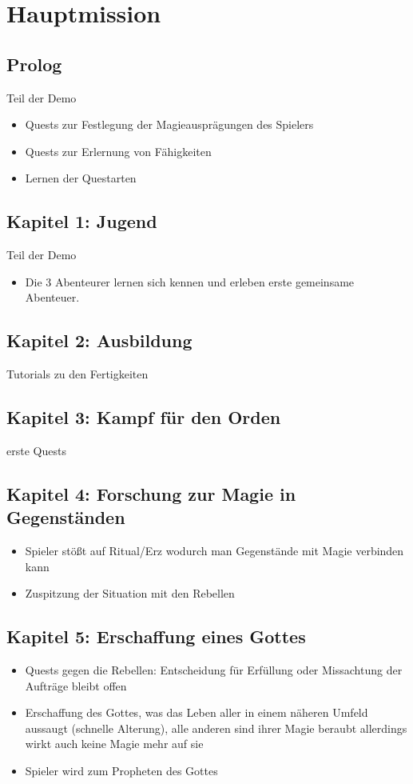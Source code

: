 \chapter{Hauptmission}
\section{Prolog}
Teil der Demo
\begin{itemize}
	\item Quests zur Festlegung der Magieausprägungen des Spielers
	\item Quests zur Erlernung von Fähigkeiten
	\item Lernen der Questarten
\end{itemize}
\section{Kapitel 1: Jugend}
Teil der Demo
\begin{itemize}
	\item Die 3 Abenteurer lernen sich kennen und erleben erste gemeinsame Abenteuer.
\end{itemize}
\section{Kapitel 2: Ausbildung}
Tutorials zu den Fertigkeiten
\section{Kapitel 3: Kampf für den Orden}
erste Quests
\section{Kapitel 4: Forschung zur Magie in Gegenständen}
\begin{itemize}
	\item Spieler stößt auf Ritual/Erz wodurch man Gegenstände mit Magie verbinden kann
	\item Zuspitzung der Situation mit den Rebellen
\end{itemize}
\section{Kapitel 5: Erschaffung eines Gottes}
\begin{itemize}
	\item Quests gegen die Rebellen: Entscheidung für Erfüllung oder Missachtung der Aufträge bleibt offen
	\item Erschaffung des Gottes, was das Leben aller in einem näheren Umfeld aussaugt (schnelle Alterung), alle anderen sind ihrer Magie beraubt allerdings wirkt auch keine Magie mehr auf sie
	\item Spieler wird zum Propheten des Gottes
\end{itemize}

